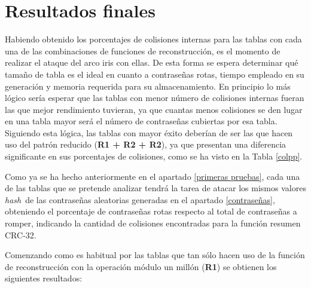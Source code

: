 \documentclass[12pt,spanish,listoffigures,listoftables,listofalgorithms]{tfgetsinf}
\newcommand{\hash}{\textit{hash}}
\begin{document}
\section{Resultados finales}

Habiendo obtenido los porcentajes de colisiones internas para las tablas con cada una de las combinaciones de funciones de reconstrucción, es el momento de realizar el ataque del arco iris con ellas. De esta forma se espera determinar qué tamaño de tabla es el ideal en cuanto a contraseñas rotas, tiempo empleado en su generación y memoria requerida para su almacenamiento. En principio lo más lógico sería esperar que las tablas con menor número de colisiones internas fueran las que mejor rendimiento tuvieran, ya que cuantas menos colisiones se den lugar en una tabla mayor será el número de contraseñas cubiertas por esa tabla. Siguiendo esta lógica, las tablas con mayor éxito deberían de ser las que hacen uso del patrón reducido (\textbf{R1 + R2 + R2}), ya que presentan una diferencia significante en sus porcentajes de colisiones, como se ha visto en la Tabla \ref{colpp}.

Como ya se ha hecho anteriormente en el apartado \ref{primeras pruebas}, cada una de las tablas que se pretende analizar tendrá la tarea de atacar los mismos valores \hash~de las contraseñas aleatorias generadas en el apartado \ref{contraseñas}, obteniendo el porcentaje de contraseñas rotas respecto al total de contraseñas a romper, indicando la cantidad de colisiones encontradas para la función resumen CRC-32.

Comenzando como es habitual por las tablas que tan sólo hacen uso de la función de reconstrucción con la operación módulo un millón (\textbf{R1}) se obtienen los siguientes resultados:
\end{document}
